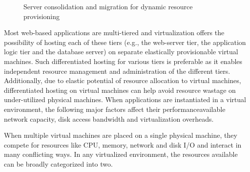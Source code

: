 \begin{figure}[t]
\begin{center}
\vspace{-0.1in}
\caption{Server consolidation and migration for dynamic resource provisioning}
\label{consolidation-migration}
\end{center}
\end{figure}



Most web-based applications are multi-tiered and 
virtualization
offers the possibility of hosting each of these tiers (e.g., the 
web-server tier,
the application logic tier and the database server) on separate
elastically provisionable virtual machines. Such differentiated hosting
for various tiers is preferable %
as it enables independent resource management and
administration of the different tiers. Additionally, due to
elastic potential of resource allocation to virtual machines,
differentiated hosting on virtual machines can help avoid resource
wastage on under-utilized physical machines.
When applications are instantiated in a virtual
environment, the following major factors affect their 
performance\textemdash{}available network capacity, disk access bandwidth
and virtualization overheads. 


When multiple virtual machines 
are placed on a single physical machine,
they compete for resources like CPU, memory, network and disk I/O
and interact in many conflicting ways. 
In any virtualized environment, the resources available can 
be broadly categorized into two.

